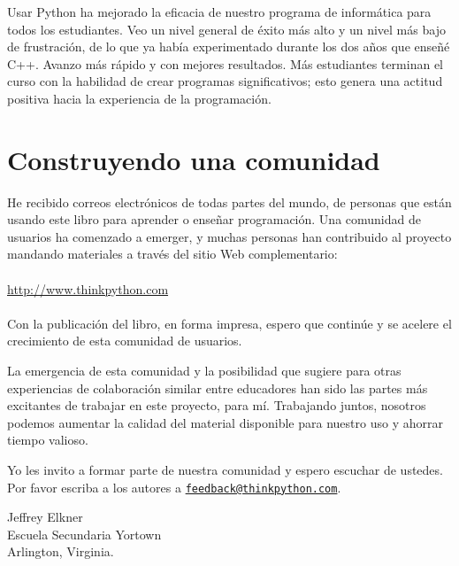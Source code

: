 Usar Python ha mejorado la eficacia de nuestro programa de informática
para todos los estudiantes. Veo un nivel general de éxito más alto
y un nivel más bajo de frustración, de lo que ya había experimentado
durante los dos años que enseñé C++. Avanzo más rápido y con mejores
resultados. Más estudiantes terminan el curso con la habilidad de
crear programas significativos; esto genera una actitud positiva hacia
la experiencia de la programación.

\section*{Construyendo una comunidad}

He recibido correos electrónicos de todas partes del mundo, de personas
que están usando este libro para aprender o enseñar programación.
Una comunidad de usuarios ha comenzado a emerger, y muchas personas
han contribuido al proyecto mandando materiales a través del sitio
Web complementario: \\
 \\
\url{ http://www.thinkpython.com }\\
 \\

Con la publicación del libro, en forma impresa, espero que continúe
y se acelere el crecimiento de esta comunidad de usuarios.

La emergencia de esta comunidad y la posibilidad que sugiere para
otras experiencias de colaboración similar entre educadores han sido
las partes más excitantes de trabajar en este proyecto, para mí. Trabajando
juntos, nosotros podemos aumentar la calidad del material disponible
para nuestro uso y ahorrar tiempo valioso.

Yo les invito a formar parte de nuestra comunidad y espero escuchar
de ustedes. Por favor escriba a los autores a \texttt{\url{feedback@thinkpython.com}}.

\vspace{0.25in}
 
\begin{flushleft}
Jeffrey Elkner\\
 Escuela Secundaria Yortown\\
 Arlington, Virginia.\\
 
\par\end{flushleft}


